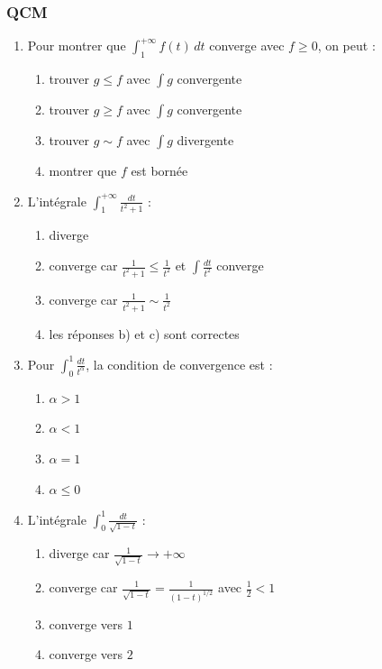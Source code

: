 \documentclass[../PolyS4.tex]{subfiles}
\begin{document}
\subsubsection*{QCM}

\begin{enumerate}
\item Pour montrer que $\displaystyle\int_{1}^{+\infty} f(t) \, dt$ converge avec $f \geq 0$, on peut :
\begin{enumerate}
\item trouver $g \leq f$ avec $\int g$ convergente
\item trouver $g \geq f$ avec $\int g$ convergente
\item trouver $g \sim f$ avec $\int g$ divergente
\item montrer que $f$ est bornée
\end{enumerate}

\item L'intégrale $\displaystyle\int_{1}^{+\infty} \frac{dt}{t^2 + 1}$ :
\begin{enumerate}
\item diverge
\item converge car $\frac{1}{t^2+1} \leq \frac{1}{t^2}$ et $\int \frac{dt}{t^2}$ converge
\item converge car $\frac{1}{t^2+1} \sim \frac{1}{t^2}$
\item les réponses b) et c) sont correctes
\end{enumerate}

\item Pour $\displaystyle\int_{0}^{1} \frac{dt}{t^{\alpha}}$, la condition de convergence est :
\begin{enumerate}
\item $\alpha > 1$
\item $\alpha < 1$
\item $\alpha = 1$
\item $\alpha \leq 0$
\end{enumerate}

\item L'intégrale $\displaystyle\int_{0}^{1} \frac{dt}{\sqrt{1-t}}$ :
\begin{enumerate}
\item diverge car $\frac{1}{\sqrt{1-t}} \to +\infty$
\item converge car $\frac{1}{\sqrt{1-t}} = \frac{1}{(1-t)^{1/2}}$ avec $\frac{1}{2} < 1$
\item converge vers $1$
\item converge vers $2$
\end{enumerate}
\end{enumerate}
\end{document}
